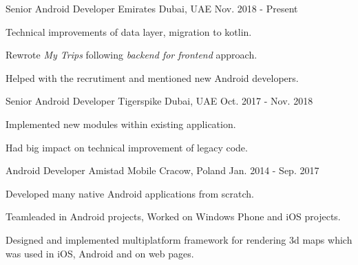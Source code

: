 

\begin{cventries}

  \cventry
    {Senior Android Developer} %
    {Emirates} %
    {Dubai, UAE} %
    {Nov. 2018 - Present} %
    {
      \begin{cvitems} %
        \item {Technical improvements of data layer, migration to kotlin.}
\item {Rewrote \textit{My Trips} following \textit{backend for frontend} approach.}
        \item {Helped with the recrutiment and mentioned new Android developers.}
      \end{cvitems}
    }

  \cventry
    {Senior Android Developer} %
    {Tigerspike} %
    {Dubai, UAE} %
    {Oct. 2017 - Nov. 2018} %
    {
      \begin{cvitems} %
        \item {Implemented new modules within existing application.}
        \item {Had big impact on technical improvement of legacy code.}
      \end{cvitems}
    }

  \cventry
    {Android Developer} %
    {Amistad Mobile} %
    {Cracow, Poland} %
    {Jan. 2014 - Sep. 2017} %
    {
      \begin{cvitems} %
        \item {Developed many native Android applications from scratch.}
        \item {Teamleaded in Android projects, Worked on Windows Phone and iOS projects.}
        \item {Designed and implemented multiplatform framework for rendering 3d maps which was used in iOS, Android and on web pages.}
      \end{cvitems}
    }


\end{cventries}
